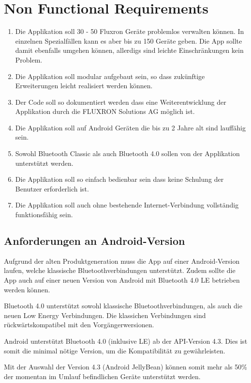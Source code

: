 
\section{Non Functional Requirements}
\label{sec:Non Functional Requirements}

\begin{enumerate}
\item Die Applikation soll 30 - 50 Fluxron Geräte problemlos verwalten können. In einzelnen Spezialfällen kann es aber bis zu 150 Geräte geben. Die App sollte damit ebenfalls umgehen können, allerdigs sind leichte Einschränkungen kein Problem.
\item Die Applikation soll modular aufgebaut sein, so dass zukünftige Erweiterungen leicht realisiert werden können.
\item Der Code soll so dokumentiert werden dass eine Weiterentwicklung der Applikation durch die FLUXRON Solutions AG möglich ist.
\item Die Applikation soll auf Android Geräten die bis zu 2 Jahre alt sind lauffähig sein.
\item Sowohl Bluetooth Classic als auch Bluetooth 4.0 sollen von der Applikation unterstützt werden.
\item Die Applikation soll so einfach bedienbar sein dass keine Schulung der Benutzer erforderlich ist.
\item Die Applikation soll auch ohne bestehende Internet-Verbindung vollständig funktionsfähig sein.
\end{enumerate}


\subsection{Anforderungen an Android-Version}
\label{subsec:Non Functional Requirements}
Aufgrund der alten Produktgeneration muss die App auf einer Android-Version laufen, welche klassische Bluetoothverbindungen unterstützt. Zudem sollte die App auch auf einer neuen Version von Android mit Bluetooth 4.0 \ac{LE} betrieben werden können.

Bluetooth 4.0 unterstützt sowohl klassische Bluetoothverbindungen, als auch die neuen Low Energy Verbindungen. Die klassichen Verbindungen sind rückwärtskompatibel mit den Vorgängerwersionen.\cite{bt_standard}

Android unterstützt Bluetooth 4.0 (inklusive \ac{LE}) ab der API-Version 4.3\cite{bt_android}. Dies ist somit die minimal nötige Version, um die Kompatibilität zu gewährleisten.

Mit der Auswahl der Version 4.3 (Android JellyBean) können somit mehr als 50\% der momentan im Umlauf \cite{android_distribution} befindlichen Geräte unterstützt werden.